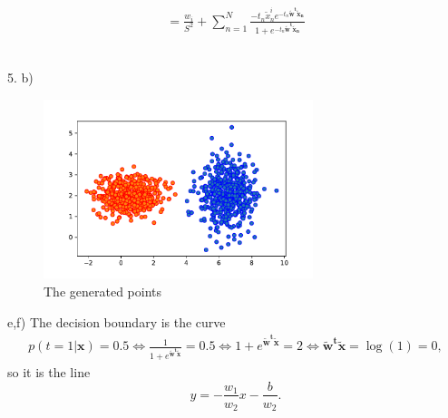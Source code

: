 \documentclass[english]{exercisesheet}
\begin{document}
\begin{solution}
\begin{align*}
 =\frac{w_i}{S^{2}}+\sum_{n=1}^N\frac{-t_n\tilde{x}_n^ie^{-t_n\bm{\tilde{w}^t\tilde{x}_n}}}{1+e^{-t_n\bm{\tilde{w}^t\tilde{x}_n}}}
\end{align*}
\\
\par 5. b)
\begin{figure}[h]
\centering
 \includegraphics[width=0.7\textwidth]{points.pdf}
 \caption{The generated points}
\end{figure}

\par e,f) The decision boundary is the curve
\begin{align*}
 p(t=1|\bm{x})=0.5 \Leftrightarrow \frac{1}{1+e^{\bm{\tilde{w}^t\tilde{x}}}}=0.5\Leftrightarrow 1+e^{\bm{\tilde{w}^t\tilde{x}}}=2\Leftrightarrow \bm{\tilde{w}^t\tilde{x}}=\log(1)=0,
\end{align*}
so it is the line
\begin{equation*}
 y=-\frac{w_1}{w_2}x-\frac{b}{w_2}.
\end{equation*}


\end{solution}
\end{document}

